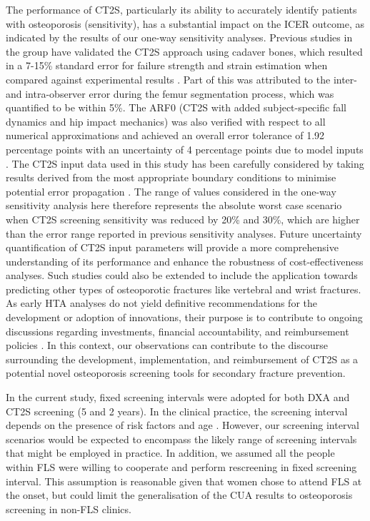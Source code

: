 The performance of CT2S, particularly its ability to accurately identify patients with osteoporosis (sensitivity), has a substantial impact on the ICER outcome, as indicated by the results of our one-way sensitivity analyses. Previous studies in the group have validated the CT2S approach using cadaver bones, which resulted in a 7-15\% standard error for failure strength and strain estimation when compared against experimental results \cite{4-6}. Part of this was attributed to the inter- and intra-observer error during the femur segmentation process, which was quantified to be within 5\%. The ARF0 (CT2S with added subject-specific fall dynamics and hip impact mechanics) was also verified with respect to all numerical approximations and achieved an overall error tolerance of 1.92 percentage points with an uncertainty of 4 percentage points due to model inputs \cite{4-6}. The CT2S input data used in this study has been carefully considered by taking results derived from the most appropriate boundary conditions to minimise potential error propagation \cite{4-7}. The range of values considered in the one-way sensitivity analysis here therefore represents the absolute worst case scenario when CT2S screening sensitivity was reduced by 20\% and 30\%, which are higher than the error range reported in previous sensitivity analyses. Future uncertainty quantification of CT2S input parameters will provide a more comprehensive understanding of its performance and enhance the robustness of cost-effectiveness analyses. Such studies could also be extended to include the application towards predicting other types of osteoporotic fractures like vertebral and wrist fractures. As early HTA analyses do not yield definitive recommendations for the development or adoption of innovations, their purpose is to contribute to ongoing discussions regarding investments, financial accountability, and reimbursement policies \cite{4-12}. In this context, our observations can contribute to the discourse surrounding the development, implementation, and reimbursement of CT2S as a potential novel osteoporosis screening tools for secondary fracture prevention.

In the current study, fixed screening intervals were adopted for both DXA and CT2S screening (5 and 2 years). In the clinical practice, the screening interval depends on the presence of risk factors and age \cite{4-79,4-80}. However, our screening interval scenarios would be expected to encompass the likely range of screening intervals that might be employed in practice. In addition, we assumed all the people within FLS were willing to cooperate and perform rescreening in fixed screening interval. This assumption is reasonable given that women chose to attend FLS at the onset, but could limit the generalisation of the CUA results to osteoporosis screening in non-FLS clinics.

